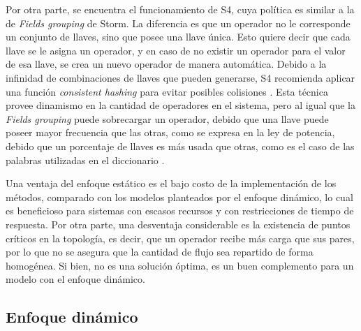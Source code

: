 
Por otra parte, se encuentra el funcionamiento de S4, cuya política es similar a la de \textit{Fields grouping} de Storm. La diferencia es que un operador no le corresponde un conjunto de llaves, sino que posee una llave única. Esto quiere decir que cada llave se le asigna un operador, y en caso de no existir un operador para el valor de esa llave, se crea un nuevo operador de manera automática. Debido a la infinidad de combinaciones de llaves que pueden generarse, S4 recomienda aplicar una función \textit{consistent hashing} para evitar posibles colisiones \citep{X11cp}. Esta técnica provee dinamismo en la cantidad de operadores en el sistema, pero al igual que la \textit{Fields grouping} puede sobrecargar un operador, debido que una llave puede poseer mayor frecuencia que las otras, como se expresa en la ley de potencia, debido que un porcentaje de llaves es más usada que otras, como es el caso de las palabras utilizadas en el diccionario \citep{rushton2010handbook}.

Una ventaja del enfoque estático es el bajo costo de la implementación de los métodos, comparado con los modelos planteados por el enfoque dinámico, lo cual es beneficioso para sistemas con escasos recursos y con restricciones de tiempo de respuesta. Por otra parte, una desventaja considerable es la existencia de puntos críticos en la topología, es decir, que un operador recibe más carga que sus pares, por lo que no se asegura que la cantidad de flujo sea repartido de forma homogénea. Si bien, no es una solución óptima, es un buen complemento para un modelo con el enfoque dinámico.

\subsection{Enfoque dinámico}
\label{subsec:enfoqueDinamicoBC}


